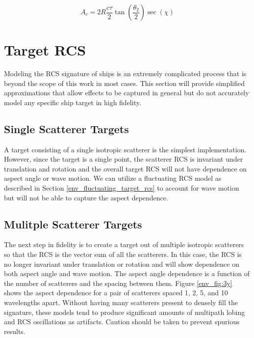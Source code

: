 \begin{equation}
\label{env_eq:7c}
A_c = 2R\frac{c\tau}{2}\tan\left(\frac{\theta_2}{2}\right)\sec(\chi)
\end{equation}

\section{Target RCS}
Modeling the RCS signature of ships is an extremely complicated process that is beyond the scope of this work in most cases. This section will provide simplified approximations that allow effects to be captured in general but do not accurately model any specific ship target in high fidelity.

\subsection{Single Scatterer Targets}
A target consisting of a single isotropic scatterer is the simplest implementation. However, since the target is a single point, the scatterer RCS is invariant under translation and rotation and the overall target RCS will not have dependence on aspect angle or wave motion. We can utilize a fluctuating RCS model as described in Section \ref{env_fluctuating_target_rcs} to account for wave motion but will not be able to capture the aspect dependence.

\subsection{Mulitple Scatterer Targets}
The next step in fidelity is to create a target out of multiple isotropic scatterers so that the RCS is the vector sum of all the scatterers. In this case, the RCS is no longer invariant under translation or rotation and will show dependence on both aspect angle and wave motion. The aspect angle dependence is a function of the number of scatterers and the spacing between them. Figure \ref{env_fig:3y} shows the aspect dependence for a pair of scatterers spaced 1, 2, 5, and 10 wavelengths apart. Without having many scatterers present to densely fill the signature, these models tend to produce significant amounts of multipath lobing and RCS oscillations as artifacts. Caution should be taken to prevent spurious results.

